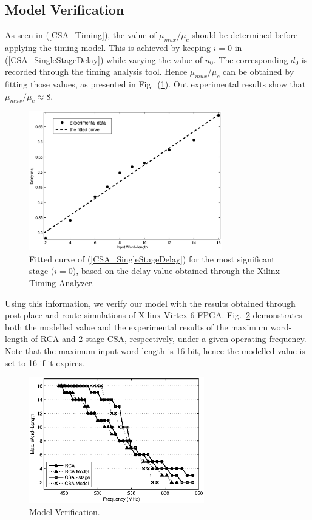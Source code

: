 \documentclass[journal]{IEEEtran}
\begin{document}
\subsection{Model Verification}
As seen in (\ref{CSA_Timing}), the value of $\mu_{mux}/\mu_c$ should be determined before applying the timing model. This is achieved by keeping $i=0$ in (\ref{CSA_SingleStageDelay}) while varying the value of $n_0$. The corresponding $d_0$ is recorded through the timing analysis tool. Hence $\mu_{mux}/\mu_c$ can be obtained by fitting those values, as presented in Fig.~(\ref{DelayFitting}). Out experimental results show that $\mu_{mux}/\mu_c\approx8$.
\begin{figure}[htbp]
  \centering
  \includegraphics[width=3.3in]{./Figures/Fitting.eps}
  \caption{Fitted curve of (\ref{CSA_SingleStageDelay}) for the most significant stage ($i=0$), based on the delay value obtained through the Xilinx Timing Analyzer.}
  \label{DelayFitting}
\end{figure}

Using this information, we verify our model with the results obtained through post place and route simulations of Xilinx Virtex-6 FPGA. Fig.~\ref{CSA Model Verification} demonstrates both the modelled value and the experimental results of the maximum word-length of RCA and 2-stage CSA, respectively, under a given operating frequency. Note that the maximum input word-length is 16-bit, hence the modelled value is set to 16 if it expires. 
\begin{figure}[htbp]
  \centering
  \includegraphics[width=3in]{./Figures/Model.eps}
  \caption{Model Verification.}
  \label{CSA Model Verification}
\end{figure}
\end{document}
